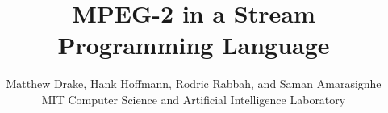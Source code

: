 \documentclass[times,12pt,onecolumn]{article}
\title{MPEG-2 in a Stream Programming Language}
\author{
  Matthew Drake, Hank Hoffmann, Rodric Rabbah, and Saman Amarasignhe\\
  MIT Computer Science and Artificial Intelligence Laboratory
}
\date{}
\begin{document}
\maketitle
\thispagestyle{empty}

\begin{abstract}

\end{abstract}





%


%





\end{document}
